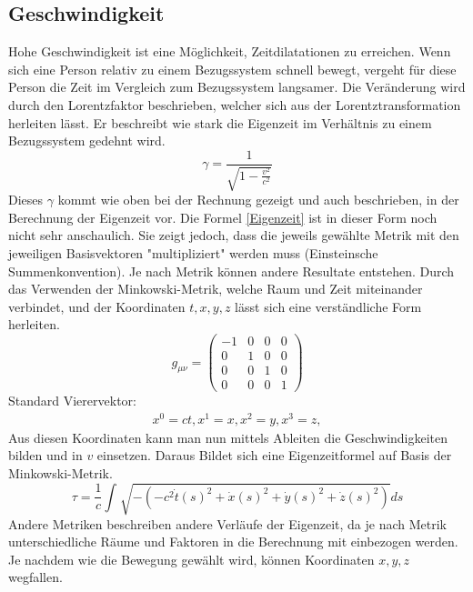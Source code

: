 \begin{refsection}
\subsection{Geschwindigkeit}
Hohe Geschwindigkeit ist eine Möglichkeit, Zeitdilatationen zu erreichen. Wenn sich eine Person relativ zu einem Bezugssystem schnell bewegt, vergeht f\"ur diese Person die Zeit im Vergleich zum Bezugssystem langsamer. Die Ver\"anderung wird durch den Lorentzfaktor beschrieben, welcher sich aus der Lorentztransformation herleiten l\"asst. Er beschreibt wie stark die Eigenzeit im  Verhältnis zu einem Bezugssystem gedehnt wird. %
\begin{equation}
    \gamma=\frac{1}{\sqrt{1-\displaystyle\frac{v^2}{c^2}}} 
\end{equation}
Dieses $\gamma$ kommt wie oben bei der Rechnung gezeigt und auch beschrieben, in der Berechnung der Eigenzeit vor. %
Die Formel \ref{Eigenzeit} ist in dieser Form noch nicht sehr anschaulich. Sie zeigt jedoch, dass die jeweils gewählte Metrik mit den jeweiligen Basisvektoren "multipliziert" werden muss (Einsteinsche Summenkonvention). Je nach Metrik können andere Resultate entstehen.
Durch das Verwenden der Minkowski-Metrik, welche Raum und Zeit miteinander verbindet, und der Koordinaten $t, x, y, z$ l\"asst sich eine verst\"andliche Form herleiten. 
\begin{equation}
    g_{\mu\nu}=
    \begin{pmatrix}
        -1 & 0 & 0 & 0 \\
        0 & 1 & 0 & 0 \\
        0 & 0 & 1 & 0 \\
        0 & 0 & 0 & 1
    \end{pmatrix}
\end{equation}
Standard Vierervektor:
\begin{align*}
    x^{0}=ct,
    x^{1}=x,
    x^{2}=y,
    x^{3}=z,
\end{align*}
Aus diesen Koordinaten kann man nun mittels Ableiten die Geschwindigkeiten bilden und in $v$ einsetzen.
Daraus Bildet sich eine Eigenzeitformel auf Basis der Minkowski-Metrik.
\begin{equation}
    \tau
    =
    \frac{1}{c}\int_{}^{}\sqrt{-(-c^2\dot{t}(s)^{2}+\dot{x}(s)^{2}+\dot{y}(s)^{2}+\dot{z}(s)^{2})}ds
\end{equation}
Andere Metriken beschreiben andere Verläufe der Eigenzeit, da je nach Metrik unterschiedliche Räume und Faktoren in die Berechnung mit einbezogen werden. 
Je nachdem wie die Bewegung gew\"ahlt wird, können Koordinaten $x, y, z$ wegfallen.

\end{refsection}
